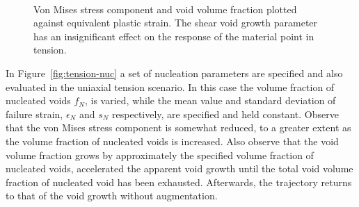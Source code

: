 \begin{figure}[htbp]
  \begin{center}
    ~ 
    \caption{Von Mises stress component and void volume fraction plotted
      against equivalent plastic strain. The shear void growth
      parameter has an insignificant effect on the response of the
      material point in tension.}
    \label{fig:tension-kw}
  \end{center}
\end{figure}

In Figure~\ref{fig:tension-nuc} a set of nucleation parameters are
specified and also evaluated in the uniaxial tension scenario. In this
case the volume fraction of nucleated voids $f_{N}$, is varied, while
the mean value and standard deviation of failure strain, $\epsilon_N$
and $s_N$ respectively, are specified and held constant. Observe that
the von Mises stress component is somewhat reduced, to a greater extent as
the volume fraction of nucleated voids is increased. Also observe that
the void volume fraction grows by approximately the specified volume
fraction of nucleated voids, accelerated the apparent void growth
until the total void volume fraction of nucleated void has been
exhausted. Afterwards, the trajectory returns to that of the void
growth without augmentation.


